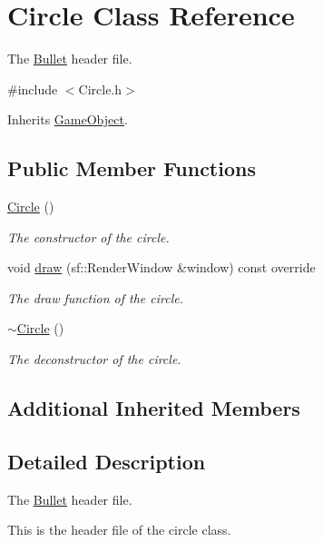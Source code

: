 \hypertarget{class_circle}{\section{Circle Class Reference}
\label{class_circle}
}


The \hyperlink{class_bullet}{Bullet} header file.  




{\ttfamily \#include $<$Circle.\+h$>$}



Inherits \hyperlink{class_game_object}{Game\+Object}.

\subsection*{Public Member Functions}
\begin{DoxyCompactItemize}
\item 
\hyperlink{class_circle_ad1ecfcfc7bf34529c6a6d6c448bf70fe}{Circle} ()
\begin{DoxyCompactList}\small\item\em The constructor of the circle. \end{DoxyCompactList}\item 
void \hyperlink{class_circle_a30d1fb3767d304f79b34336f28658e02}{draw} (sf\+::\+Render\+Window \&window) const override
\begin{DoxyCompactList}\small\item\em The draw function of the circle. \end{DoxyCompactList}\item 
\hyperlink{class_circle_ae3f30436e645d73e368e8ee55f8d1650}{$\sim$\+Circle} ()
\begin{DoxyCompactList}\small\item\em The deconstructor of the circle. \end{DoxyCompactList}\end{DoxyCompactItemize}
\subsection*{Additional Inherited Members}


\subsection{Detailed Description}
The \hyperlink{class_bullet}{Bullet} header file. 

This is the header file of the circle class. 


